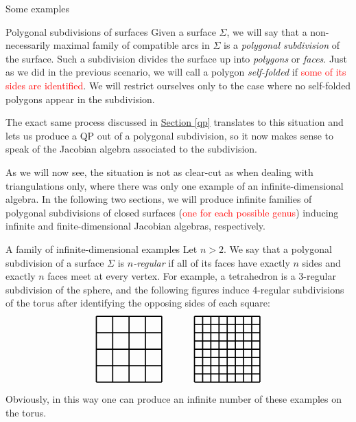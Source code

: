 \begin{chapter}{Some examples}
\begin{section}{Polygonal subdivisions of surfaces}
Given a surface $\Sigma$, we will say that a non-necessarily maximal family of compatible arcs in $\Sigma$ is a \emph{polygonal subdivision} of the surface. Such a subdivision divides the surface up into \emph{polygons} or \emph{faces}. Just as we did in the previous scenario, we will call a polygon \emph{self-folded} if \textcolor{red}{some of its sides are identified}. We will restrict ourselves only to the case where no self-folded polygons appear in the subdivision.

The exact same process discussed in \hyperref[qp]{Section \ref*{qp}} translates to this situation and lets us produce a QP out of a polygonal subdivision, so it now makes sense to speak of the Jacobian algebra associated to the subdivision.

As we will now see, the situation is not as clear-cut as when dealing with triangulations only, where there was only one example of an infinite-dimensional algebra. In the following two sections, we will produce infinite families of polygonal subdivisions of closed surfaces (\textcolor{red}{one for each possible genus}) inducing infinite and finite-dimensional Jacobian algebras, respectively.
\end{section}

\begin{section}{A family of infinite-dimensional examples}
Let $n>2$. We say that a polygonal subdivision of a surface $\Sigma$ is \emph{$n$-regular} if all of its faces have exactly $n$ sides and exactly $n$ faces meet at every vertex. For example, a tetrahedron is a $3$-regular subdivision of the sphere, and the following figures induce $4$-regular subdivisions of the torus after identifying the opposing sides of each square:
\[
\begin{tikzpicture}[scale=1.2, very thick]
\Square{0}{0}
\Square{3}{0}

\foreach \x in {-0.5,0,0.5}
{
\draw (\x, -1) to (\x, 1);
\draw (-1, \x) to (1, \x);
}

\foreach \x in {-0.75,-0.5, ..., 0.75}
{
\draw (3+\x, -1) to (3+\x, 1);
\draw (2, \x) to (4, \x);
}
\end{tikzpicture}
\]
Obviously, in this way one can produce an infinite number of these examples on the torus.


\end{section}
\end{chapter}
